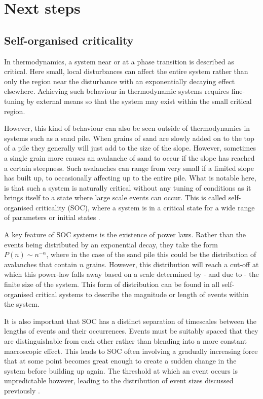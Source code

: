 \documentclass{article}
\numberwithin{equation}{section}
\begin{document}
\section{Next steps}
\subsection{Self-organised criticality}
In thermodynamics, a system near or at a phase transition is described as critical. Here small, local disturbances can affect the entire system rather than only the region near the disturbance with an exponentially decaying effect elsewhere. Achieving such behaviour in thermodynamic systems requires fine-tuning by external means so that the system may exist within the small critical region.

However, this kind of behaviour can also be seen outside of thermodynamics in systems such as a sand pile. When grains of sand are slowly added on to the top of a pile they generally will just add to the size of the slope. However, sometimes a single grain more causes an avalanche of sand to occur if the slope has reached a certain steepness. Such avalanches can range from very small if a limited slope has built up, to occasionally affecting up to the entire pile. What is notable here, is that such a system is naturally critical without any tuning of conditions as it brings itself to a state where large scale events can occur. This is called self-organised criticality (SOC), where a system is in a critical state for a wide range of parameters or initial states \cite{Tang1993SOCState, Jensen1998Self-organizedSystems}.

A key feature of SOC systems is the existence of power laws. Rather than the events being distributed by an exponential decay, they take the form $P(n)\sim n^{-\alpha}$, where in the case of the sand pile this could be the distribution of avalanches that contain $n$ grains. However, this distribution will reach a cut-off at which this power-law falls away based on a scale determined by - and due to - the finite size of the system. This form of distribution can be found in all self-organised critical systems to describe the magnitude or length of events within the system.

It is also important that SOC has a distinct separation of timescales between the lengths of events and their occurrences. Events must be suitably spaced that they are distinguishable from each other rather than blending into a more constant macroscopic effect. This leads to SOC often involving a gradually increasing force that at some point becomes great enough to create a sudden change in the system before building up again. The threshold at which an event occurs is unpredictable however, leading to the distribution of event sizes discussed previously \cite{Jensen1998Self-organizedSystems}.
\end{document}
